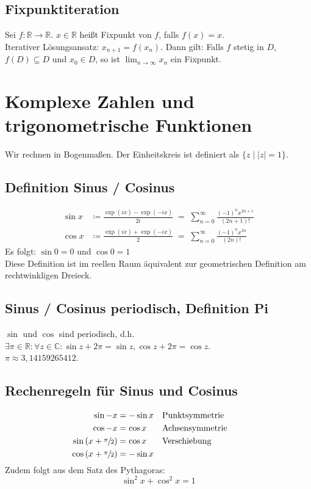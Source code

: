 \documentclass[halfparscip]{scrartcl}
\newcounter{subsection2}
\begin{document}
\subsection*{Fixpunktiteration}
Sei $f : \mathbb{R} \rightarrow \mathbb{R}$. $x \in \mathbb{R}$ heißt Fixpunkt von $f$, falls $f(x) = x$.\\
Iterativer Lösungsansatz: $x_{n+1} = f(x_n)$. Dann gilt: Falls $f$ stetig in $D$, $f(D) \subseteq D$ und $x_0 \in D$, so ist $\lim_{n \rightarrow \infty}x_n$ ein Fixpunkt.

\newpage
\section{Komplexe Zahlen und trigonometrische Funktionen}
Wir rechnen in Bogenmaßen. Der Einheitskreis ist definiert als $\big\{z \;\big\vert\; \vert z\vert = 1\big\}$.

\subsection{Definition Sinus / Cosinus}
\begin{align*}
	\sin x &\coloneqq \frac{\exp(ix) - \exp(-ix)}{2i} \;=\; \sum_{n=0}^{\infty}\frac{(-1)^nx^{2n+1}}{(2n+1)!}\\
	\cos x &\coloneqq \frac{\exp(ix) + \exp(-ix)}{2} \;=\; \sum_{n=0}^{\infty}\frac{(-1)^nx^{2n}}{(2n)!}
\end{align*}
Es folgt: $\sin 0 = 0$ und $\cos 0 = 1$\\
Diese Definition ist im reellen Raum äquivalent zur geometrischen Definition am rechtwinkligen Dreieck.

\subsection{Sinus / Cosinus periodisch, Definition Pi}
$\sin$ und $\cos$ sind periodisch, d.h. $\exists \pi \in \mathbb{R}: \forall z \in \mathbb{C} : \sin z + 2 \pi = \sin z, \cos z + 2\pi = \cos z$.\\
$\pi \approx 3,14159265412$.

\subsection*{Rechenregeln für Sinus und Cosinus}
\begin{align*}
	\sin -x                              & = -\sin x  &  & \text{Punktsymmetrie}  &  &  &  &  \\
	\cos -x                              & = \cos x   &  & \text{Achsensymmetrie} &  \\
	\sin \left(x + \sfrac{\pi}{2}\right) & = \cos x   &  & \text{Verschiebung}    &  \\
	\cos \left(x + \sfrac{\pi}{2}\right) & = - \sin x &
\end{align*}
Zudem folgt aus dem Satz des Pythagoras:
\begin{equation*}
	\sin^2 x + \cos^2 x = 1
\end{equation*}
\end{document}
